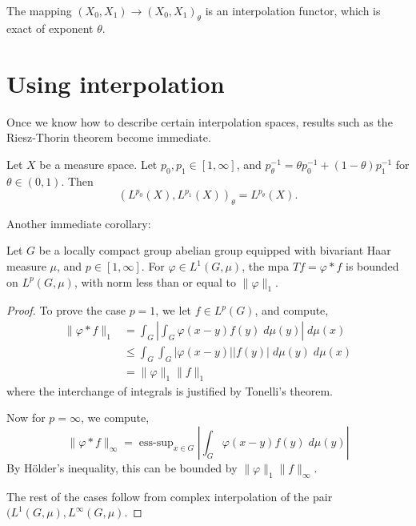 \begin{proposition}
    The mapping $(X_0,X_1)\rightarrow (X_0,X_1)_\theta$ is an interpolation
    functor, which is exact of exponent $\theta$.
\end{proposition}

\section{Using interpolation}
Once we know how to describe certain interpolation spaces, results
such as the Riesz-Thorin theorem become immediate.
\begin{proposition}
    Let $X$ be a measure space.
    Let $p_0,p_1 \in [1,\infty]$, and $p_\theta^{-1} = \theta p_0^{-1}+(1-\theta)p_1^{-1}$
    for $\theta \in (0,1)$.
    Then
    \begin{equation*}
        (L^{p_0}(X),L^{p_1}(X))_\theta = L^{p_\theta}(X).
    \end{equation*}
\end{proposition}

Another immediate corollary:
\begin{proposition}
    Let $G$ be a locally compact group abelian group equipped
    with bivariant Haar measure $\mu$, and $p \in [1,\infty]$. For $\varphi \in L^1(G,\mu)$, the mpa
    $Tf = \varphi * f$ is bounded on $L^p(G,\mu)$, with norm less than or equal
    to $\|\varphi\|_1$.
\end{proposition}
\begin{proof}
    To prove the case $p = 1$, we let $f \in L^p(G)$, and compute,
    \begin{align*}
        \|\varphi * f\|_1 &= \int_G \left|\int_G\varphi(x-y)f(y)\;d\mu(y)\right|\;d\mu(x)\\
        &\leq \int_G \int_G |\varphi(x-y)||f(y)|\;d\mu(y)\;d\mu(x)\\
        &= \|\varphi\|_1\|f\|_1
    \end{align*}
    where the interchange of integrals is justified by Tonelli's theorem.
    
    Now for $p = \infty$, we compute,
    \begin{equation*}
        \|\varphi*f\|_\infty = \operatorname{ess-sup}_{x \in G} \left|\int_G \varphi(x-y)f(y)\;d\mu(y)\right|
    \end{equation*}
    By H\"older's inequality, this can be bounded by $\|\varphi\|_1\|f\|_\infty$.
    
    The rest of the cases
    follow from complex interpolation of the pair $(L^1(G,\mu),L^\infty(G,\mu)$.
\end{proof} 

